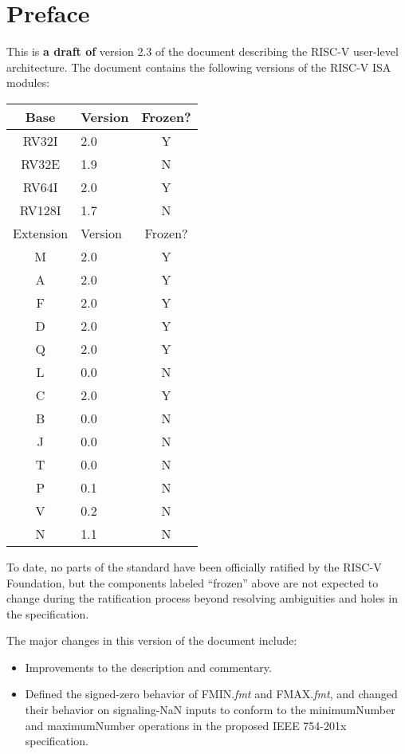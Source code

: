 \chapter{Preface}

This is {\bf a draft of} version 2.3 of the document describing the RISC-V
user-level architecture.  The document contains the following
versions of the RISC-V ISA modules:
\begin{table}[hbt]
  \centering
  \begin{tabular}{|c|l|c|}
    \hline
    Base     & Version & Frozen? \\
    \hline
    RV32I    & 2.0 & Y \\
    RV32E    & 1.9 & N \\
    RV64I    & 2.0 & Y \\
    RV128I   & 1.7 & N \\
    \hline
    Extension & Version & Frozen? \\
    \hline
    M        & 2.0 & Y \\
    A        & 2.0 & Y \\
    F        & 2.0 & Y \\
    D        & 2.0 & Y \\
    Q        & 2.0 & Y \\
    L        & 0.0 & N \\
    C        & 2.0 & Y \\
    B        & 0.0 & N \\
    J        & 0.0 & N \\
    T        & 0.0 & N \\
    P        & 0.1 & N \\
    V        & 0.2 & N \\
    N        & 1.1 & N \\
    \hline
  \end{tabular}
\end{table}

To date, no parts of the standard have been officially ratified by the
RISC-V Foundation, but the components labeled ``frozen'' above are not
expected to change during the ratification process beyond resolving
ambiguities and holes in the specification.

The major changes in this version of the document include:
\begin{itemize}
\parskip 0pt
\itemsep 1pt
\item Improvements to the description and commentary.
\item Defined the signed-zero behavior of FMIN.{\em fmt} and FMAX.{\em fmt},
  and changed their behavior on signaling-NaN inputs to conform to the
  minimumNumber and maximumNumber operations in the proposed IEEE 754-201x
  specification.
\end{itemize}
~\\

